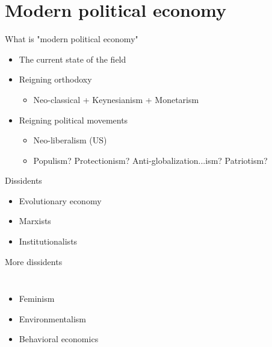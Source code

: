 \documentclass{beamer}
\begin{document}
\section{Modern political economy} 

\begin{frame}{What is "modern political economy"}
	
\begin{itemize}
    \item The current state of the field \pause
    \item Reigning orthodoxy \pause
    \begin{itemize}
        \item Neo-classical + Keynesianism + Monetarism \pause
    \end{itemize}{}
    \item Reigning political movements \pause
    \begin{itemize}
        \item Neo-liberalism (US) \pause
        \item Populism? Protectionism? Anti-globalization...ism? Patriotism?
    \end{itemize}{}
\end{itemize}

\end{frame}{}

\begin{frame}{Dissidents} 
      \begin{itemize}
        \item Evolutionary economy \pause
        \item Marxists \pause
        \item Institutionalists \pause 
      \end{itemize}
\end{frame}{}

\begin{frame}{More dissidents}
\begin{columns}[onlytextwidth]
\begin{itemize}
    \item Feminism %
    \item Environmentalism %
    \item Behavioral economics
\end{itemize}
\end{columns}
\end{frame}
\end{document}
